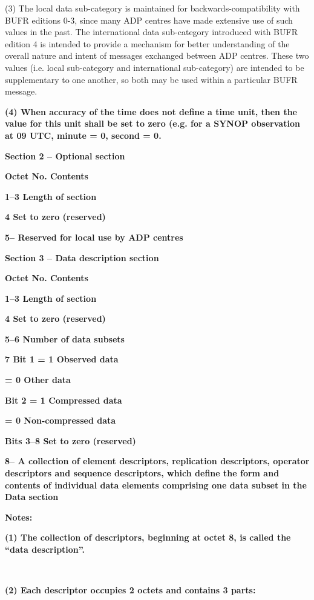 (3) The local data sub-category is maintained for backwards-compatibility with BUFR editions 0-3, since many ADP centres have made extensive use of such values in the past. The international data sub-category introduced with BUFR edition 4 is intended to provide a mechanism for better understanding of the overall nature and intent of messages exchanged between ADP centres. These two values (i.e. local sub-category and international sub-category) are intended to be supplementary to one another, so both may be used within a particular BUFR message.

\textbf{(4) When accuracy of the time does not define a time unit, then the value for this unit shall be set to zero (e.g. for a SYNOP observation at 09 UTC, minute = 0, second = 0.}

\textbf{Section 2 -- Optional section}

\textbf{Octet No. Contents}

\textbf{1--3 Length of section}

\textbf{4 Set to zero (reserved)}

\textbf{5-- Reserved for local use by ADP centres}

\textbf{Section 3 -- Data description section}

\textbf{Octet No. Contents}

\textbf{1--3 Length of section}

\textbf{4 Set to zero (reserved)}

\textbf{5--6 Number of data subsets}

\textbf{7 Bit 1 = 1 Observed data}

\textbf{= 0 Other data}

\textbf{Bit 2 = 1 Compressed data}

\textbf{= 0 Non-compressed data}

\textbf{Bits 3--8 Set to zero (reserved)}

\textbf{8-- A collection of element descriptors, replication descriptors, operator descriptors and sequence descriptors, which define the form and contents of individual data elements comprising one data subset in the Data section}

\textbf{Notes:}

\textbf{(1) The collection of descriptors, beginning at octet 8, is called the ``data description''.}

\textbf{\\
}

\textbf{(2) Each descriptor occupies 2 octets and contains 3 parts:}

